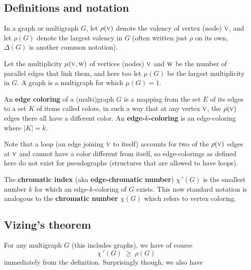 \documentclass[12pt]{article}
\let\ge\geqslant
\def\0#1{\hbox{\sc #1}}  %
\begin{document}


\subsection*{Definitions and notation}

In a graph or multigraph $G$, let $\rho(\0v)$ denote the valency of vertex
(node) $\0v$, and let $\rho(G)$ denote the largest valency in $G$ (often written
just $\rho$ on its own, $\Delta(G)$ is another common notation).

Let the multiplicity $\mu(\0v,\0w)$ of vertices (nodes) $\0v$ and $\0w$
be the number of parallel edges that link them, and here too let $\mu(G)$ be
the largest multiplicity in $G$. A graph is a multigraph for which $\mu(G)=1$.

An {\bf edge coloring} of a (multi)graph $G$ is a mapping from the
set $E$ of its edges to a set $K$ of items called colors, in such a way
that at any vertex $\0v$, the $\rho(\0v)$ edges there all have a different
color. An {\bf edge-$k$-coloring} is an edge-coloring where $|K|=k$.

Note that a loop (an edge joining $\0v$ to itself) accounts for two of the
$\rho(\0v)$ edges at $\0v$ and cannot have a color different from itself,
so edge-colorings as defined here do not exist for pseudographs (structures
that are allowed to have loops).

The {\bf chromatic index} (aka {\bf edge-chromatic number}) ${\chi\,}'(G)$ is
the smallest number $k$ for which an edge-$k$-coloring of $G$ exists. This now
standard notation is analogous to the {\bf chromatic number} $\chi(G)$ which
refers to vertex coloring.

\subsection*{Vizing's theorem}

For any multigraph $G$ (this includes graphs), we have of course
$$
  {\chi\,}'(G) \;\ge\; \rho(G)
$$
immediately from the definition. Surprisingly though, we also have
\end{document}
